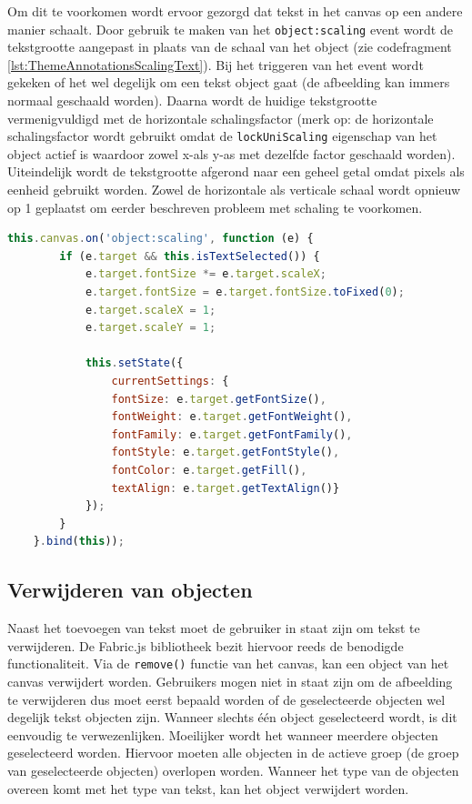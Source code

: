 Om dit te voorkomen wordt ervoor gezorgd dat tekst in het canvas op een andere manier schaalt. Door gebruik te maken van het \texttt{object:scaling} event wordt de tekstgrootte aangepast in plaats van de schaal van het object (zie codefragment \ref{lst:ThemeAnnotationsScalingText}). Bij het triggeren van het event wordt gekeken of het wel degelijk om een tekst object gaat (de afbeelding kan immers normaal geschaald worden). Daarna wordt de huidige tekstgrootte vermenigvuldigd met de horizontale schalingsfactor (merk op: de horizontale schalingsfactor wordt gebruikt omdat de \texttt{lockUniScaling} eigenschap van het object actief is waardoor zowel x-als y-as met dezelfde factor geschaald worden). Uiteindelijk wordt de tekstgrootte afgerond naar een geheel getal omdat pixels als eenheid gebruikt worden. Zowel de horizontale als verticale schaal wordt opnieuw op 1 geplaatst om eerder beschreven probleem met schaling te voorkomen. 

\begin{lstlisting}[caption={ThemeAnnotations component - text scaling},label=lst:ThemeAnnotationsScalingText,language=javascript]
	this.canvas.on('object:scaling', function (e) {
		if (e.target && this.isTextSelected()) {
			e.target.fontSize *= e.target.scaleX;
			e.target.fontSize = e.target.fontSize.toFixed(0);
			e.target.scaleX = 1;
			e.target.scaleY = 1;
			
			this.setState({
				currentSettings: {
				fontSize: e.target.getFontSize(),
				fontWeight: e.target.getFontWeight(),
				fontFamily: e.target.getFontFamily(),
				fontStyle: e.target.getFontStyle(),
				fontColor: e.target.getFill(),
				textAlign: e.target.getTextAlign()}
			});
		}
	}.bind(this));
\end{lstlisting}

\subsection{Verwijderen van objecten}
Naast het toevoegen van tekst moet de gebruiker in staat zijn om tekst te verwijderen. De Fabric.js bibliotheek bezit hiervoor reeds de benodigde functionaliteit. Via de \texttt{remove()} functie van het canvas, kan een object van het canvas verwijdert worden. Gebruikers mogen niet in staat zijn om de afbeelding te verwijderen dus moet eerst bepaald worden of de geselecteerde objecten wel degelijk tekst objecten zijn. Wanneer slechts \'{e}\'{e}n object geselecteerd wordt, is dit eenvoudig te verwezenlijken. Moeilijker wordt het wanneer meerdere objecten geselecteerd worden. Hiervoor moeten alle objecten in de actieve groep (de groep van geselecteerde objecten) overlopen worden. Wanneer het type van de objecten overeen komt met het type van tekst, kan het object verwijdert worden. 

